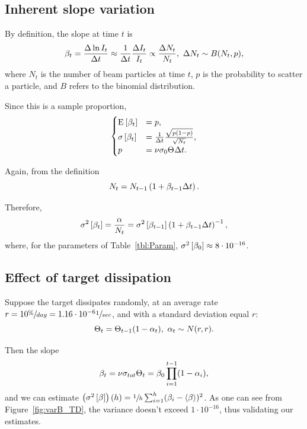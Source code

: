 \documentclass{report}
\begin{document}
\subsection{Inherent slope variation}
By definition, the slope at time $t$ is
\[
 \slp[t] = \frac{\Delta \ln I_t}{\Delta t} \approx \frac{1}{\Delta t}\frac{\Delta I_t}{I_t} \propto \frac{\Delta N_t}{N_t}, ~\Delta N_t \sim B(N_t, p),
\]
where $N_t$ is the number of beam particles at time $t$, $p$ is the probability to scatter a particle, and $B$ refers to the binomial distribution.

Since this is a sample proportion, 
\begin{equation*}
\begin{cases}
	\Xpct{\slp[t]} 	&= p, \\
	\SE{\slp[t]}		&= \frac{1}{\Delta t}\frac{\sqrt{p(1-p)}}{\sqrt{N_t}}, \\
	p 				&= \nu\CS[0]\Thick\Delta t.
\end{cases}
\end{equation*}

Again, from the definition
\[
	N_t = N_{t-1}\bkt{1 + \slp[t-1]\Delta t}.
\]

Therefore, 
\begin{equation}
\v{\slp[t]} = \frac{\alpha}{N_t} = \v{\slp[t-1]}\bkt{1 + \slp[t-1]\Delta t}^{-1},
\end{equation}
where, for the parameters of Table~\ref{tbl:Param}, $\v{\slp[0]} \approx 8\cdot10^{-16}$.

\subsection{Effect of target dissipation}
Suppose the target dissipates randomly, at an average rate $r = 10\sfrac{\%}{day} = 1.16\cdot10^{-6}\sfrac{1}{sec}$, and with a standard deviation equal $r$:
\[
	\Thick[t] = \Thick[t-1](1-\alpha_t),~ \alpha_t\sim N(r,r).
\]

Then the slope
\[
	\slp[t] = \nu\CS[tot]\Thick[t] = \slp[0]\prod_{i=1}^{t-1}(1-\alpha_i),
\]	
and we can estimate $\bkt{\v{\slp}}(h) = \sfrac 1h \sum_{i=1}^{h}(\slp[i] - \avg{\slp})^2$. As one can see from Figure~\ref{fig:varB_TD}, the variance doesn't exceed $1\cdot10^{-16}$, thus validating our estimates.
\end{document}

